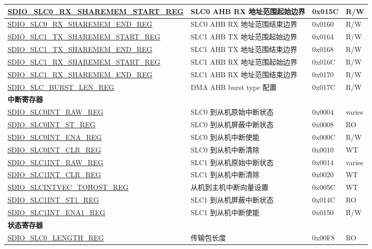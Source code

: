 \begin{longtable}{ | p{7.1cm} | p{6.1cm} | p{1.2cm} | p{1cm} | }
\hyperref[regdesc:SDIOSLC0RXSHAREMEMSTARTREG]{SDIO\_SLC0\_RX\_SHAREMEM\_START\_REG} & SLC0 AHB RX 地址范围起始边界 & 0x015C & R/W \\ \hline
\hyperref[regdesc:SDIOSLC0RXSHAREMEMENDREG]{SDIO\_SLC0\_RX\_SHAREMEM\_END\_REG} & SLC0 AHB RX 地址范围结束边界 & 0x0160 & R/W \\ \hline
\hyperref[regdesc:SDIOSLC1TXSHAREMEMSTARTREG]{SDIO\_SLC1\_TX\_SHAREMEM\_START\_REG} & SLC1 AHB TX 地址范围起始边界 & 0x0164 & R/W \\ \hline
\hyperref[regdesc:SDIOSLC1TXSHAREMEMENDREG]{SDIO\_SLC1\_TX\_SHAREMEM\_END\_REG} & SLC1 AHB TX 地址范围结束边界 & 0x0168 & R/W \\ \hline
\hyperref[regdesc:SDIOSLC1RXSHAREMEMSTARTREG]{SDIO\_SLC1\_RX\_SHAREMEM\_START\_REG} & SLC1 AHB RX 地址范围起始边界 & 0x016C & R/W \\ \hline
\hyperref[regdesc:SDIOSLC1RXSHAREMEMENDREG]{SDIO\_SLC1\_RX\_SHAREMEM\_END\_REG} & SLC1 AHB RX 地址范围结束边界 & 0x0170 & R/W \\ \hline
\hyperref[regdesc:SDIOSLCBURSTLENREG]{SDIO\_SLC\_BURST\_LEN\_REG} & DMA AHB burst type 配置 & 0x017C & R/W \\ \hline
\multicolumn{4}{|l|}{\textbf{中断寄存器}} \\ \hline
\hyperref[regdesc:SDIOSLC0INTRAWREG]{SDIO\_SLC0INT\_RAW\_REG} & SLC0 到从机原始中断状态 & 0x0004 & varies \\ \hline
\hyperref[regdesc:SDIOSLC0INTSTREG]{SDIO\_SLC0INT\_ST\_REG} & SLC0 到从机屏蔽中断状态 & 0x0008 & RO \\ \hline
\hyperref[regdesc:SDIOSLC0INTENAREG]{SDIO\_SLC0INT\_ENA\_REG} & SLC0 到从机中断使能 & 0x000C & R/W \\ \hline
\hyperref[regdesc:SDIOSLC0INTCLRREG]{SDIO\_SLC0INT\_CLR\_REG} & SLC0 到从机中断清除 & 0x0010 & WT \\ \hline
\hyperref[regdesc:SDIOSLC1INTRAWREG]{SDIO\_SLC1INT\_RAW\_REG} & SLC1 到从机原始中断状态 & 0x0014 & varies \\ \hline
\hyperref[regdesc:SDIOSLC1INTCLRREG]{SDIO\_SLC1INT\_CLR\_REG} & SLC1 到从机中断清除 & 0x0020 & WT \\ \hline
\hyperref[regdesc:SDIOSLCINTVECTOHOSTREG]{SDIO\_SLCINTVEC\_TOHOST\_REG} & 从机到主机中断向量设置 & 0x005C & WT \\ \hline
\hyperref[regdesc:SDIOSLC1INTST1REG]{SDIO\_SLC1INT\_ST1\_REG} & SLC1 到从机屏蔽中断状态 & 0x014C & RO \\ \hline
\hyperref[regdesc:SDIOSLC1INTENA1REG]{SDIO\_SLC1INT\_ENA1\_REG} & SLC1 到从机中断使能 & 0x0150 & R/W \\ \hline
\multicolumn{4}{|l|}{\textbf{状态寄存器}} \\ \hline
\hyperref[regdesc:SDIOSLC0LENGTHREG]{SDIO\_SLC0\_LENGTH\_REG} & 传输包长度 & 0x00F8 & RO \\ \hline
\end{longtable}
